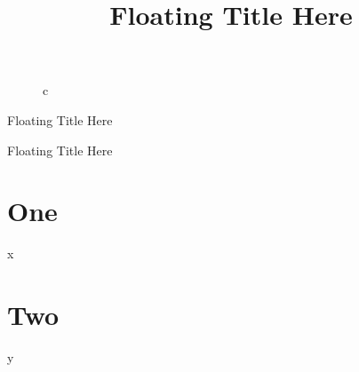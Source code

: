 \documentclass{article}
\title{Floating Title Here}
\begin{document}
\begin{figure}\caption{c}\end{figure}
\noindent\begin{minipage}{\textwidth}\begin{center}{\Huge Floating Title Here}\end{center}\end{minipage}
\begin{center}{\LARGE Floating Title Here}\end{center}
\section{One}
x
\section{Two}
y
\end{document}
